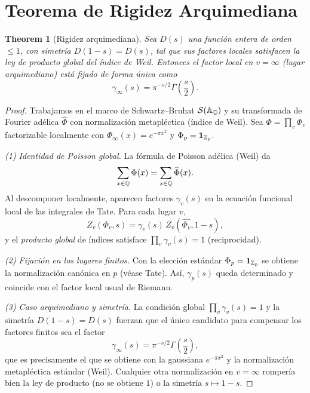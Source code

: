\section{Teorema de Rigidez Arquimediana}

\newtheorem{theoremA}{Theorem}[section]
\newtheorem{lemmaA}[theoremA]{Lemma}
\newtheorem{propA}[theoremA]{Proposition}

\begin{theoremA}[Rigidez arquimediana]
Sea $D(s)$ una función entera de orden $\le 1$, con simetría $D(1-s)=D(s)$, tal que
sus factores locales satisfacen la ley de producto global del índice de Weil. Entonces
el factor local en $v=\infty$ (lugar arquimediano) está fijado de forma única como
\[
\gamma_\infty(s)=\pi^{-s/2}\Gamma\!\left(\frac{s}{2}\right).
\]
\end{theoremA}

\begin{proof}
Trabajamos en el marco de Schwartz--Bruhat $\mathcal{S}(\Bbb A_\Bbb Q)$ y su transformada de Fourier adélica $\widehat{\Phi}$ con normalización metapléctica (índice de Weil).
Sea $\Phi=\prod_v \Phi_v$ factorizable localmente con $\Phi_\infty(x)=e^{-\pi x^2}$ y $\Phi_p=\mathbf 1_{\Bbb Z_p}$.

\emph{(1) Identidad de Poisson global.} La fórmula de Poisson adélica (Weil) da
\[
\sum_{x\in\Bbb Q}\Phi(x)=\sum_{x\in\Bbb Q}\widehat\Phi(x).
\]
Al descomponer localmente, aparecen factores $\gamma_v(s)$ en la ecuación funcional local de las integrales de Tate. Para cada lugar $v$,
\[
Z_v(\Phi_v,s)=\gamma_v(s)\,Z_v(\widehat{\Phi_v},1-s),
\]
y el \emph{producto global} de índices satisface $\prod_v \gamma_v(s)=1$ (reciprocidad).

\emph{(2) Fijación en los lugares finitos.} Con la elección estándar $\Phi_p=\mathbf 1_{\Bbb Z_p}$ se obtiene la normalización canónica en $p$ (véase Tate). Así, $\gamma_p(s)$ queda determinado y coincide con el factor local usual de Riemann.

\emph{(3) Caso arquimediano y simetría.} La condición global $\prod_v \gamma_v(s)=1$ y la simetría $D(1-s)=D(s)$ fuerzan que el único candidato para compensar los factores finitos sea el factor
\[
\gamma_\infty(s)=\pi^{-s/2}\Gamma\!\left(\frac{s}{2}\right),
\]
que es precisamente el que se obtiene con la gaussiana $e^{-\pi x^2}$ y la normalización metapléctica estándar (Weil). Cualquier otra normalización en $v=\infty$ rompería bien la ley de producto (no se obtiene $1$) o la simetría $s\mapsto 1-s$.
\end{proof}

